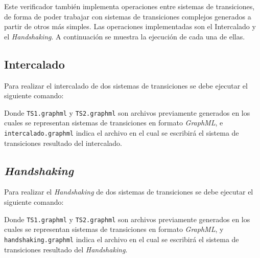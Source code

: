 Este verificador también implementa operaciones entre sistemas de transiciones, de forma de poder
trabajar con sistemas de transiciones complejos generados a partir de otros más simples.
Las operaciones implementadas son el Intercalado y el \textit{Handshaking}. A continuación
 se muestra la ejecución de cada una de ellas.

\subsection{Intercalado}
Para realizar el intercalado de dos sistemas de transiciones se debe ejecutar el siguiente comando:

\fbox{\parbox{\textwidth}{\scriptsize}}

Donde \texttt{TS1.graphml} y \texttt{TS2.graphml} son archivos previamente generados en los
 cuales se representan sistemas de transiciones en formato \textit{GraphML}, e
 \texttt{intercalado.graphml} indica el archivo en el cual se escribirá el sistema de transiciones
 resultado del intercalado.

\subsection{\textit{Handshaking}}
Para realizar el \textit{Handshaking} de dos sistemas de transiciones se debe ejecutar el
 siguiente comando:

\fbox{\parbox{\textwidth}{\scriptsize}}

Donde \texttt{TS1.graphml} y \texttt{TS2.graphml} son archivos previamente generados en los
 cuales se representan sistemas de transiciones en formato \textit{GraphML}, y
 \texttt{handshaking.graphml} indica el archivo en el cual se escribirá el sistema de transiciones
 resultado del \textit{Handshaking}.
